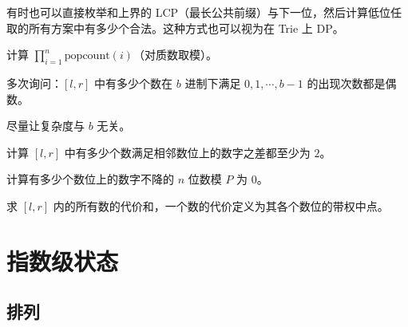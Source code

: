 有时也可以直接枚举和上界的 LCP（最长公共前缀）与下一位，然后计算低位任取的所有方案中有多少个合法。这种方式也可以视为在 Trie 上 DP。

\begin{exercise}[P4317 花神的数论题]
    计算 $\prod_{i=1}^n \mathrm{popcount}(i)$（对质数取模）。
\end{exercise}

\begin{exercise}
    多次询问：$[l,r]$ 中有多少个数在 $b$ 进制下满足 $0,1,\cdots,b-1$ 的出现次数都是偶数。

    尽量让复杂度与 $b$ 无关。
\end{exercise}

\begin{exercise}[{P13085 [SCOI2009] windy 数}]
    计算 $[l,r]$ 中有多少个数满足相邻数位上的数字之差都至少为 $2$。
\end{exercise}

\begin{example}[{P2481 [SDOI2010] 代码拍卖会}]
    计算有多少个数位上的数字不降的 $n$ 位数模 $P$ 为 $0$。
\end{example}

\begin{example}[{P3303 [SDOI2013] 淘金}]
    求 $[l,r]$ 内的所有数的代价和，一个数的代价定义为其各个数位的带权中点。
\end{example}

\begin{example}[U117267 特]
    
\end{example}

\begin{example}[{P7961 [NOIP2021] 数列}]
    
\end{example}

\begin{example}
    
\end{example}

\section{指数级状态}

\subsection{排列}

